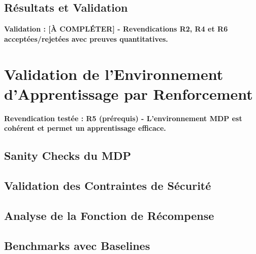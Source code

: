 \subsection{Résultats et Validation}
\label{subsec:resultats_jumeau}

\textbf{Validation : [À COMPLÉTER] - Revendications R2, R4 et R6 acceptées/rejetées avec preuves quantitatives.}

\section{Validation de l'Environnement d'Apprentissage par Renforcement}
\label{sec:validation_env_rl}

\textbf{Revendication testée : R5 (prérequis) - L'environnement MDP est cohérent et permet un apprentissage efficace.}

\subsection{Sanity Checks du MDP}
\label{subsec:sanity_checks_mdp}

\subsection{Validation des Contraintes de Sécurité}
\label{subsec:contraintes_securite}

\subsection{Analyse de la Fonction de Récompense}
\label{subsec:analyse_recompense}

\subsection{Benchmarks avec Baselines}
\label{subsec:benchmarks_baselines}

